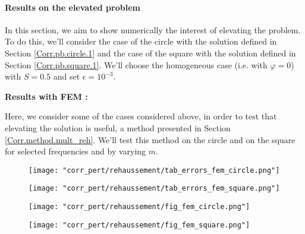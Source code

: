 \paragraph{Results on the elevated problem} \label{Corr.results.disturbed.reh} 

In this section, we aim to show numerically the interest of elevating the problem. To do this, we'll consider the case of the circle with the solution defined in Section \ref{Corr.pb.circle.1} and the case of the square with the solution defined in Section \ref{Corr.pb.square.1}. We'll choose the homogeneous case (i.e. with $\varphi=0$) with $S=0.5$ and set $\epsilon=10^{-3}$.

\textbf{Results with FEM :}

	Here, we consider some of the cases considered above, in order to test that elevating the solution is useful, a method presented in Section \ref{Corr.method.mult_reh}. We'll test this method on the circle and on the square for selected frequencies and by varying $m$.

	\begin{minipage}{0.48\linewidth}
		\begin{figure}[H]
			\centering
			\texttt{[image: "corr\_pert/rehaussement/tab\_errors\_fem\_circle.png"]}
			\label{corr_pert_fem_circle_reh}
		\end{figure} 
	\end{minipage}
	\begin{minipage}{0.48\linewidth}
		\begin{figure}[H]
			\centering
			\texttt{[image: "corr\_pert/rehaussement/tab\_errors\_fem\_square.png"]}
			\label{corr_pert_fem_square_reh}
		\end{figure} 
	\end{minipage}
	
	\begin{minipage}{0.48\linewidth}
		\begin{figure}[H]
			\centering
			\texttt{[image: "corr\_pert/rehaussement/fig\_fem\_circle.png"]}
			\label{corr_pert_fem_circle_reh_fig}
		\end{figure} 
	\end{minipage}
	\begin{minipage}{0.48\linewidth}
		\begin{figure}[H]
			\centering
			\texttt{[image: "corr\_pert/rehaussement/fig\_fem\_square.png"]}
			\label{corr_pert_fem_square_reh_fig}
		\end{figure} 
	\end{minipage}
	 
